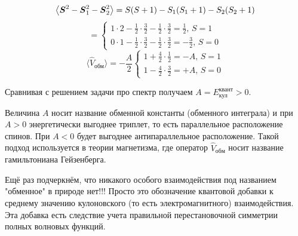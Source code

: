 \hfill
\begin{minipage}{0.666\textwidth}
	\begin{equation*}
		\left\langle\mbox{\boldmath $S$}^2 - \mbox{\boldmath $S$}_1^2 - \mbox{\boldmath $S$}_2^2\right\rangle
		= S(S+1) - S_1 (S_1 +1) - S_2(S_2+1)
	\end{equation*}    
	\begin{equation*}=\left\{
		\begin{aligned}
			1\cdot 2 - \frac{1}{2}\cdot \frac{3}{2} - \frac{1}{2}\cdot \frac{3}{2} = \frac{1}{2}, \, S = 1\\
			0\cdot 1- \frac{1}{2}\cdot \frac{3}{2} - \frac{1}{2}\cdot \frac{3}{2} = -\frac{3}{2}, \, S=0
		\end{aligned}
		\right.
	\end{equation*}
	\begin{equation*}
	\langle \hat{V}_\text{обм}\rangle = - \frac{A}{2} \left\{
	\begin{aligned}
		1+ \frac{4}{2} \cdot \frac{1}{2} = - A, \, S=1\\
		1 - \frac{4}{2}\cdot \frac{3}{2} = +A, \, S = 0
	\end{aligned}
	\right.
\end{equation*}
\end{minipage}
Сравнивая с решением задачи про спектр получаем $A = E_\text{кул}^\text{квант} > 0$.

Величина $A$ носит название обменной константы (обменного интеграла) и при $A>0$ энергетически выгоднее триплет, то есть параллельное расположение спинов.
При $A<0$ будет выгоднее антипараллельное расположение.
Такой подход используется в теории магнетизма, где оператор $\hat{V}_\text{обм}$ носит название гамильтониана Гейзенберга.

Ещё раз подчеркнём, что никакого особого взаимодействия под названием "обменное" в природе нет!!!
Просто это обозначение квантовой добавки к среднему значению кулоновского (то есть электромагнитного) взаимодействия.
Эта добавка есть следствие учета правильной перестановочной симметрии полных волновых функций.

